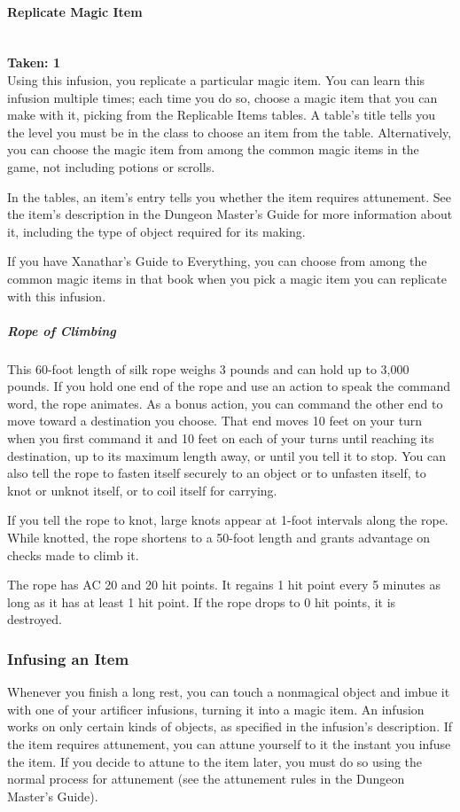 \documentclass[letterpaper,openany,oneside,twocolumn]{book}
\begin{document}
\paragraph*{Replicate Magic Item}\hfill\\
\textbf{Taken: 1}\\
Using this infusion, you replicate a particular magic item. You can learn this infusion multiple times; each time you do so, choose a magic item that you can make with it, picking from the Replicable Items tables. A table's title tells you the level you must be in the class to choose an item from the table. Alternatively, you can choose the magic item from among the common magic items in the game, not including potions or scrolls.

In the tables, an item's entry tells you whether the item requires attunement. See the item's description in the Dungeon Master's Guide for more information about it, including the type of object required for its making.

If you have Xanathar's Guide to Everything, you can choose from among the common magic items in that book when you pick a magic item you can replicate with this infusion.
\subparagraph*{Rope of Climbing}
This 60-foot length of silk rope weighs 3 pounds and can hold up to 3,000 pounds. If you hold one end of the rope and use an action to speak the command word, the rope animates. As a bonus action, you can command the other end to move toward a destination you choose. That end moves 10 feet on your turn when you first command it and 10 feet on each of your turns until reaching its destination, up to its maximum length away, or until you tell it to stop. You can also tell the rope to fasten itself securely to an object or to unfasten itself, to knot or unknot itself, or to coil itself for carrying.

If you tell the rope to knot, large knots appear at 1-foot intervals along the rope. While knotted, the rope shortens to a 50-foot length and grants advantage on checks made to climb it.

The rope has AC 20 and 20 hit points. It regains 1 hit point every 5 minutes as long as it has at least 1 hit point. If the rope drops to 0 hit points, it is destroyed.
\subsubsection*{Infusing an Item}
Whenever you finish a long rest, you can touch a nonmagical object and imbue it with one of your artificer infusions, turning it into a magic item. An infusion works on only certain kinds of objects, as specified in the infusion's description. If the item requires attunement, you can attune yourself to it the instant you infuse the item. If you decide to attune to the item later, you must do so using the normal process for attunement (see the attunement rules in the Dungeon Master's Guide).
\end{document}
